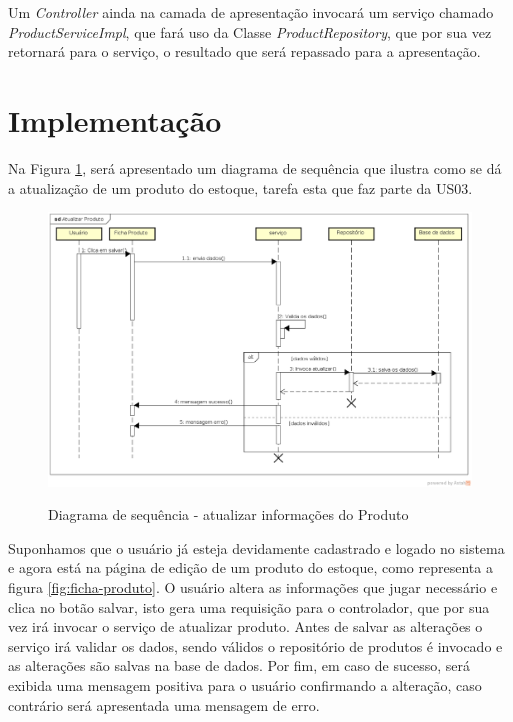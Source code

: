 \documentclass[a4paper,12pt]{monografia}
\begin{document}
Um \textit{Controller} ainda na camada de apresentação invocará um serviço chamado \textit{ProductServiceImpl}, que fará uso da Classe \textit{ProductRepository}, que por sua vez retornará para o serviço, o resultado que será repassado para a apresentação.


\section{Implementação} %
\label{sec:implementacao}

Na Figura \ref{fig:sd-atualiza}, será apresentado um diagrama de sequência que ilustra como se dá a atualização de um produto do estoque, tarefa esta que faz parte da US03.

\begin{figure}[H]
\centering
\caption{Diagrama de sequência - atualizar informações do Produto}
\centering
\includegraphics[width=16cm]{img/diagramas/sd-atualiza-produto.eps}\\
\label{fig:sd-atualiza}
\end{figure}

Suponhamos que o usuário já esteja devidamente cadastrado e logado no sistema e agora está na página de edição de um produto do estoque, como representa a figura \ref{fig:ficha-produto}. O usuário altera as informações que jugar necessário e clica no botão salvar, isto gera uma requisição para o controlador, que por sua vez irá invocar o serviço de atualizar produto. Antes de salvar as alterações o serviço irá validar os dados, sendo válidos o repositório de produtos é invocado e as alterações são salvas na base de dados. Por fim,  em caso de sucesso, será exibida uma mensagem positiva para o usuário confirmando a alteração, caso contrário será apresentada uma mensagem de erro.
\end{document}
